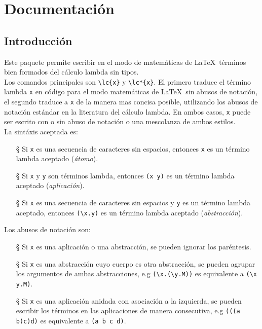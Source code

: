 \section{Documentación}

\subsection*{Introducción}
Este paquete permite escribir en el modo de matemáticas de \LaTeX\ términos bien formados del cálculo lambda sin tipos.\\

Los comandos principales son \texttt{\textbackslash lc\{x\}} y \texttt{\textbackslash lc*\{x\}}. El primero traduce el término lambda \texttt{x} en código para el modo matemáticas de \LaTeX\ sin abusos de notación, el segundo traduce a \texttt{x} de la manera mas concisa posible, utilizando los abusos de notación estándar en la literatura del cálculo lambda. En ambos casos, \texttt{x} puede ser escrito con o sin abuso de notación o una mescolanza de ambos estilos.\\

La sintáxis aceptada es:
\begin{itemize}
\item[\S] Si \texttt{x} es una secuencia de caracteres sin espacios, entonces \texttt{x} es un término lambda aceptado (\emph{átomo}).

\item[\S] Si \texttt{x} y \texttt{y} son términos lambda, entonces \texttt{(x y)} es un término lambda aceptado (\emph{aplicación}).

\item[\S] Si \texttt{x} es una secuencia de caracteres sin espacios y \texttt{y} es un término lambda aceptado, entonces \texttt{(\textbackslash x.y)} es un término lambda aceptado (\emph{abstracción}).
\end{itemize}

Los abusos de notación son:
\begin{itemize}
\item[\S] Si \texttt{x} es una aplicación o una abstracción, se pueden ignorar
  los paréntesis.
\item[\S] Si \texttt{x} es una abstracción cuyo cuerpo es otra abstracción, se
  pueden agrupar los argumentos de ambas abstracciones, e.g
  \texttt{(\textbackslash x.(\textbackslash y.M))} es equivalente a \texttt{(\textbackslash x y.M)}.
\item[\S] Si \texttt{x} es una aplicación anidada con asociación a la izquierda,
  se pueden escribir los términos en las aplicaciones de manera consecutiva, e.g
  \texttt{(((a b)c)d)} es equivalente a \texttt{(a b c d)}.
\end{itemize}

